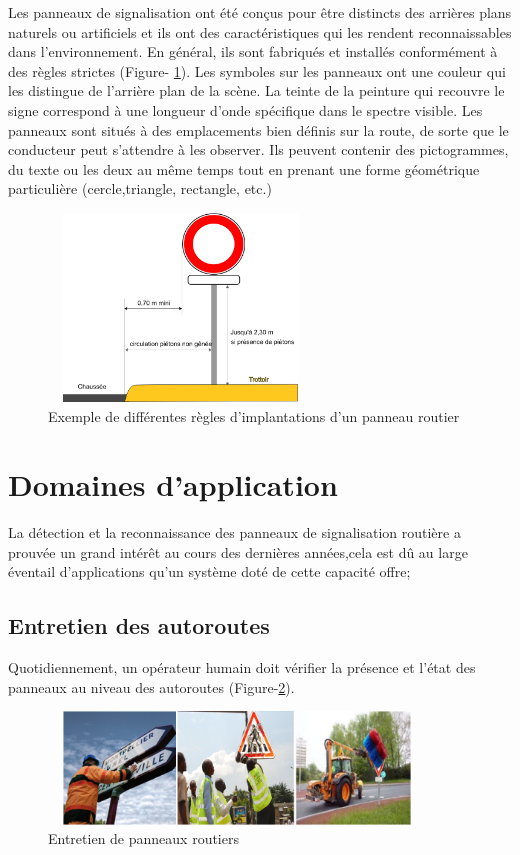 Les panneaux de signalisation ont été conçus pour être distincts des arrières plans naturels ou artificiels et ils ont des caractéristiques qui les rendent reconnaissables dans l’environnement. En général, ils sont fabriqués et installés conformément à des règles strictes (Figure- \ref{fig:formes}).
Les symboles sur les panneaux ont une couleur qui les distingue de l'arrière plan de la scène. La teinte de la peinture qui recouvre le signe correspond à une longueur d'onde spécifique dans le spectre visible. Les panneaux sont situés à des emplacements bien définis sur la route, de sorte que le conducteur peut s’attendre à les observer. Ils  peuvent contenir des pictogrammes, du texte ou les deux au même temps tout en prenant une forme géométrique particulière (cercle,triangle, rectangle, etc.)
\begin{figure}[h]
  \centering
  \includegraphics[width=7cm,height=5cm]{images/rte.png}
  \caption{Exemple de différentes règles d'implantations d'un panneau routier}
  \label{fig:formes}
\end{figure}

\newpage
\section{Domaines d’application}

La détection et la reconnaissance des panneaux de signalisation routière a prouvée un grand intérêt au cours des dernières années,cela est dû au large éventail d'applications qu'un système doté de cette capacité offre;

\subsection{Entretien des autoroutes}

Quotidiennement, un opérateur humain doit  vérifier la présence et l'état des panneaux au niveau des autoroutes (Figure-\ref{fig:entretien}).\\

\begin{figure}[h]
        \centering
        \includegraphics[width=10cm,height=3cm]{images/ccc.png}
        \caption{Entretien de panneaux routiers}
        \label{fig:entretien}
\end{figure}

